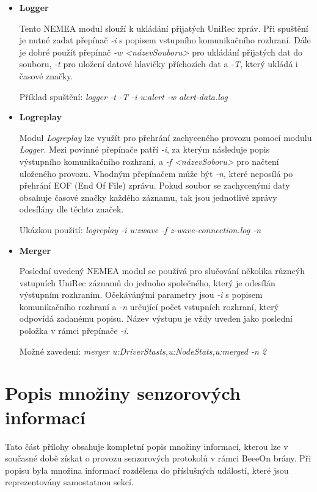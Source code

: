 \documentclass[thesis=M,czech]{FITthesis}[2012/06/26]
\begin{document}
\begin{itemize}
 \item \textbf{Logger}

 Tento NEMEA modul slouží k ukládání přijatých UniRec zpráv. Při spuštění je nutné zadat 
 přepínač \textit{-i} s popisem vstupního komunikačního rozhraní. Dále je dobré použít přepínač
 \textit{-w <názevSouboru>} pro ukládání přijatých dat do souboru, \textit{-t} pro uložení datové
 hlavičky příchozích
 dat a \textit{-T}, který ukládá i časové značky.
 
 Příklad spuštění: \textit{logger -t -T -i u:alert -w alert-data.log}
 
 \item \textbf{Logreplay}
 
 Modul \textit{Logreplay} lze využít pro přehrání zachyceného provozu pomocí modulu \textit{Logger}.
 Mezi povinné
 přepínače patří
 \textit{-i}, za kterým následuje popis výstupního komunikačního rozhraní, a \textit{-f <názevSoboru>}
 pro načtení
 uloženého provozu. Vhodným přepínačem může být \textit{-n}, které neposílá po přehrání EOF (End Of File)
 zprávu. Pokud soubor se zachycenými daty obsahuje časové značky každého záznamu, tak jsou 
 jednotlivé zprávy odesílány dle těchto značek.
 
 Ukázkou použití: \textit{logreplay -i u:zwave -f z-wave-connection.log -n}
 
 \item \textbf{Merger}
 
 Poslední uvedený NEMEA modul se používá pro slučování několika různcýh vstupních UniRec
 záznamů do jednoho společného, který je odesílán výstupním rozhraním. Očekávánými parametry jsou
 \textit{-i} s popisem komunikačního rozhraní a \textit{-n} určující počet vstupních rozhraní,
 který odpovídá
 zadanému popisu. Název výstupu je vždy uveden jako poslední položka v rámci přepínače \textit{-i}.
 
 Možné zavedení: \textit{merger u:DriverStasts,u:NodeStats,u:merged -n 2}
 

\end{itemize}


\chapter{Popis množiny senzorových informací} \label{sensorData}
Tato část přílohy obsahuje kompletní popis množiny informací, kterou lze v současné době získat o 
provozu senzorových protokolů v rámci BeeeOn brány. Při popisu byla množina informací rozdělena
do příslušných událostí, které
jsou reprezentovány samostatnou sekcí.
\end{document}
